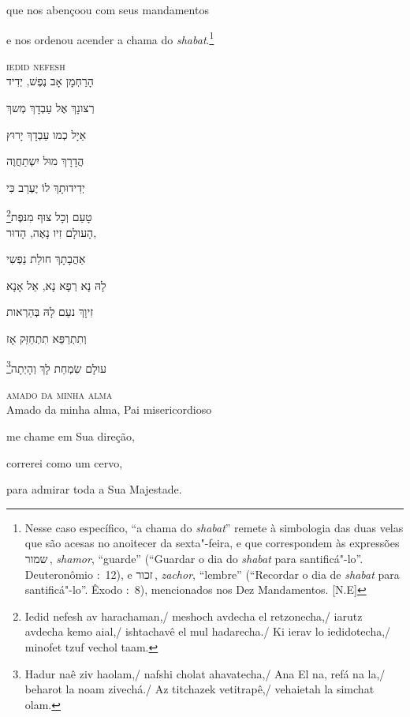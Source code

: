 que nos abençoou com seus mandamentos\label{ref01}

e nos ordenou acender a chama do \textit{shabat}.\footnote{Nesse caso 
	específico, ``a chama do \textit{shabat}'' remete à simbologia das duas velas
	que são acesas no anoitecer da sexta"-feira, e que correspondem às
	expressões שמור\,, \emph{shamor}, ``guarde'' (``Guardar o dia do
	\emph{shabat} para santificá"-lo''. Deuteronômio :~12),
	e זכור\,, \emph{zachor}, ``lembre''
	(``Recordar o dia de \emph{shabat} para santificá"-lo''. Êxodo
	:~8), mencionados nos Dez Mandamentos. [N.E]}

\movetoevenpage
\raggedleft


\textsc{iedid nefesh}\\[15pt]

הָרַחְמָן אָב נֶפֶשׁ, יְדִיד 

רְצונָךְ אֶל עַבְדָךְ מְשךְ 

אַיָל כְמו עַבְדָךְ יָרוּץ 

הֲדָרָךְ מוּל יִשְתַחֲוֶה 

יְדִידוּתָךְ לוֹ יֶעְרַב כִּי 

\footnote{Iedid nefesh av harachaman,/ meshoch avdecha el retzonecha,/ iarutz avdecha kemo aial,/ ishtachavê el mul hadarecha./ Ki ierav lo iedidotecha,/ minofet tzuf vechol taam.}טָעַם וְכָל צוּף מִנּפֶת\\[10pt]

הָעולָם זִיו נָאֶה, הָדוּר,

אַהֲבָתָךְ חולַת נַפְשִי 

לָהּ נָא רְפָא נָא, אֵל אָנָא 

זִיוָךְ נעַם לָהּ בְּהַרְאות

וְתִתְרַפֵּא תִתְחֵזֵּק אָז

\footnote{Hadur naê ziv haolam,/ nafshi cholat ahavatecha,/ Ana El na, refá na la,/ beharot la noam zivechá./ Az titchazek vetitrapê,/ vehaietah la simchat olam.}עולָם שִׂמְחַת לָךְ וְהָיְתָה\\[10pt]


\movetooddpage
\raggedright

\textsc{amado da minha alma}\\[15pt]

{Amado da minha alma}, Pai misericordioso

me chame em Sua direção,

correrei como um cervo,

para admirar toda a Sua Majestade.

